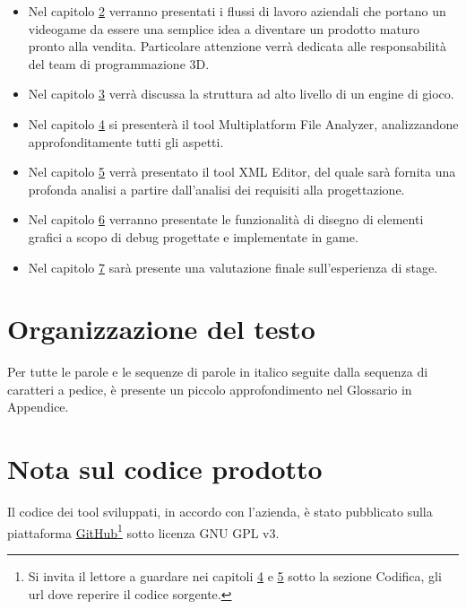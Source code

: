 \begin{itemize}
	\item Nel capitolo \hyperref[cap:milestone]{2} verranno presentati i flussi di lavoro aziendali che portano un videogame da essere una semplice idea a diventare un prodotto maturo pronto alla vendita. Particolare attenzione verrà dedicata alle responsabilità del team di programmazione 3D.
	
	\item Nel capitolo \hyperref[cap:engine-di-gioco]{3} verrà discussa la struttura ad alto livello di un engine di gioco.
	
	\item Nel capitolo \hyperref[cap:multiplatform-file-analyzer]{4} si presenterà il tool Multiplatform File Analyzer, analizzandone approfonditamente tutti gli aspetti.
	
	\item Nel capitolo \hyperref[cap:xml-editor]{5} verrà presentato il tool XML Editor, del quale sarà fornita una profonda analisi a partire dall'analisi dei requisiti alla progettazione.
	
	\item Nel capitolo \hyperref[cap:game]{6} verranno presentate le funzionalità di disegno di elementi grafici a scopo di debug progettate e implementate in game.
	
	\item Nel capitolo \hyperref[cap:conclusioni]{7} sarà presente una valutazione finale sull'esperienza di stage.
\end{itemize}

\section{Organizzazione del testo}

Per tutte le parole e le sequenze di parole in italico seguite dalla sequenza di caratteri  a pedice, è presente un piccolo approfondimento nel Glossario in Appendice.

\section{Nota sul codice prodotto}

Il codice dei tool sviluppati, in accordo con l'azienda, è stato pubblicato sulla piattaforma \hyperref{https://github.com/}{}{}{GitHub\textregistered}\footnote{Si invita il lettore a guardare nei capitoli \hyperref[cap:multiplatform-file-analyzer]{4} e \hyperref[cap:xml-editor]{5} sotto la sezione Codifica, gli url dove reperire il codice sorgente.} sotto licenza GNU GPL v3.\\

